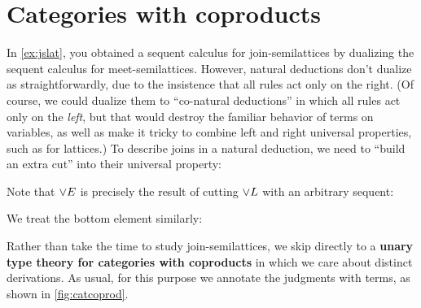 \section{Categories with coproducts}
\label{sec:catcoprod}


In \cref{ex:jslat}, you obtained a {sequent calculus} for join-semilattices by dualizing the sequent calculus for meet-semilattices.
However, {natural deductions} don't dualize as straightforwardly, due to the insistence that all rules act only on the right.
(Of course, we could dualize them to ``co-natural deductions'' in which all rules act only on the \emph{left}, but that would destroy the familiar behavior of terms on variables, as well as make it tricky to combine left and right universal properties, such as for lattices.)
To describe joins in a natural deduction, we need to ``build an extra cut'' into their universal property:
Note that $\joinE$ is precisely the result of cutting $\joinL$ with an arbitrary sequent:
\begin{mathpar}
\end{mathpar}
We treat the bottom element similarly:
\begin{mathpar}
\end{mathpar}

Rather than take the time to study join-semilattices, we skip directly to a \textbf{unary type theory for categories with coproducts} in which we care about distinct derivations.
As usual, for this purpose we annotate the judgments with terms, as shown in \cref{fig:catcoprod}.

